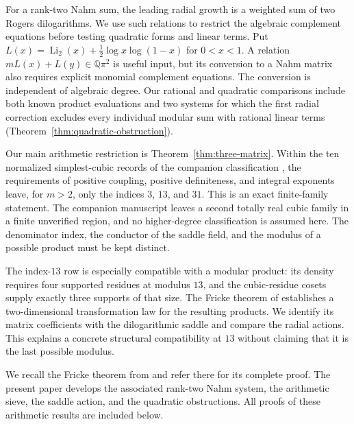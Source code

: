 \documentclass[11pt,reqno]{amsart}
\theoremstyle{remark}
\numberwithin{equation}{section}
\newcommand{\QQ}{\mathbb Q}
\begin{document}
For a rank-two Nahm sum, the leading radial growth is a weighted sum of
two Rogers dilogarithms. We use such relations to restrict the algebraic
complement equations before testing quadratic forms and linear terms. Put
$L(x)=\operatorname{Li}_2(x)+\tfrac12\log x\log(1-x)$ for $0<x<1$.
A relation $mL(x)+L(y)\in\QQ\pi^2$ is useful input, but its conversion
to a Nahm matrix also requires explicit monomial complement equations.
The conversion is independent of algebraic degree. Our rational and
quadratic comparisons include both known product evaluations and two
systems for which the first radial correction excludes every individual
modular sum with rational linear terms
(Theorem~\ref{thm:quadratic-obstruction}).

Our main arithmetic restriction is Theorem~\ref{thm:three-matrix}.
Within the ten normalized simplest-cubic records of the companion
classification \cite{CubicClassification}, the requirements of positive
coupling, positive definiteness, and integral exponents leave, for $m>2$,
only the indices $3$, $13$, and $31$. This is an exact finite-family
statement. The companion manuscript leaves a second totally real cubic
family in a finite unverified region, and no higher-degree classification
is assumed here. The denominator index, the conductor of the saddle
field, and the modulus of a possible product must be kept distinct.

The index-$13$ row is especially compatible with a modular product:
its density requires four supported residues at modulus $13$, and the
cubic-residue cosets supply exactly three supports of that size. The
Fricke theorem of \cite{FrickeCompanion} establishes a two-dimensional
transformation law for the resulting products. We identify its matrix
coefficients with the dilogarithmic saddle and compare the radial
actions. This explains a concrete structural compatibility at $13$
without claiming that it is the last possible modulus.

We recall the Fricke theorem from \cite[Theorem~1.1]{FrickeCompanion}
and refer there for its complete proof. The present paper develops the
associated rank-two Nahm system, the arithmetic sieve, the saddle
action, and the quadratic obstructions. All proofs of these arithmetic
results are included below.
\end{document}
